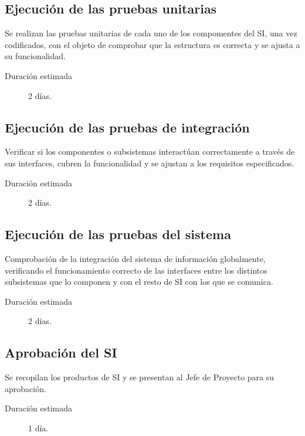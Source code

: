 \documentclass[11pt,a4paper,spanish,twoside]{report}
\begin{document}
\subsection{Ejecución de las pruebas unitarias}
Se realizan las pruebas unitarias de cada uno de los compomentes del SI, una
vez codificados, con el objeto de comprobar que la estructura es correcta y
se ajusta a su funcionalidad. 
\begin{description}
\item[Duración estimada] 2 días.
\end{description}

\subsection{Ejecución de las pruebas de integración}
Verificar si los componentes o subsistemas interactúan correctamente a través
de sus interfaces, cubren la funcionalidad y se ajustan a los requisitos
especificados. 
\begin{description}
\item[Duración estimada] 2 días.
\end{description}

\subsection{Ejecución de las pruebas del sistema}
Comprobación de la integración del sistema de información globalmente,
verificando el funcionamiento correcto de las interfaces entre los distintos
subsistemas que lo componen y con el resto de SI con los que se comunica. 
\begin{description}
\item[Duración estimada] 2 días.
\end{description}

\subsection{Aprobación del SI}
Se recopilan los productos de SI y se presentan al Jefe de Proyecto para su
aprobación.
\begin{description}
\item[Duración estimada] 1 día.
\end{description}

 

\end{document}
